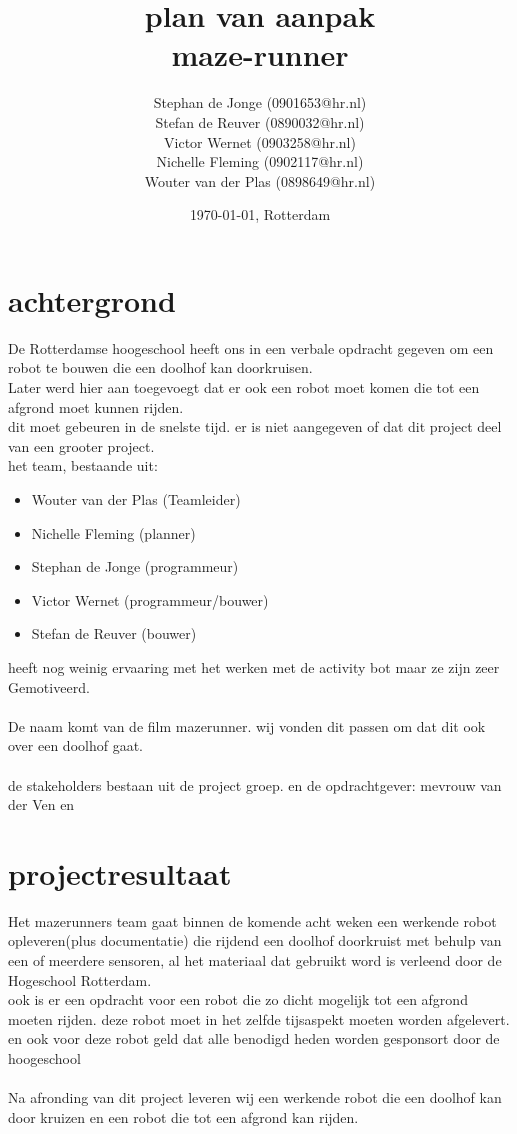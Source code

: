 \documentclass[oneside]{book}
\title{plan van aanpak\\maze-runner}
\author{
	Stephan de Jonge (0901653@hr.nl)\\
	Stefan de Reuver (0890032@hr.nl)\\
	Victor Wernet (0903258@hr.nl)\\
	Nichelle Fleming (0902117@hr.nl)\\
	Wouter van der Plas (0898649@hr.nl)
}
\date{\today, Rotterdam}
\begin{document}
\maketitle
\tableofcontents


\chapter{achtergrond}

De Rotterdamse hoogeschool heeft ons in een verbale opdracht gegeven om een robot te bouwen die een doolhof kan doorkruisen.\\
Later werd hier aan toegevoegt dat er ook een robot moet komen die tot een afgrond moet kunnen rijden.\\
dit moet gebeuren in de snelste tijd. er is niet aangegeven of dat dit project deel van een grooter project.\\
het team, bestaande uit:\\
\begin{itemize}
	\item Wouter van der Plas (Teamleider)
	\item Nichelle Fleming (planner)
	\item Stephan de Jonge (programmeur)
	\item Victor Wernet (programmeur/bouwer)
	\item Stefan de Reuver (bouwer)
\end{itemize}	
heeft nog weinig ervaaring met het werken met de activity bot maar ze zijn zeer Gemotiveerd.\\
\\
De naam komt van de film mazerunner. wij vonden dit passen om dat dit ook over een doolhof gaat.\\
\\
de stakeholders bestaan uit de project groep. en de opdrachtgever: mevrouw van der Ven en

\clearpage
\chapter{projectresultaat}
Het mazerunners team gaat binnen de komende acht weken een werkende robot opleveren(plus documentatie) die rijdend een doolhof doorkruist met behulp van een of meerdere sensoren, al het materiaal dat gebruikt word is verleend door de Hogeschool Rotterdam.\\
ook is er een opdracht voor een robot die zo dicht mogelijk tot een afgrond moeten rijden. deze robot moet in het zelfde tijsaspekt moeten worden afgelevert. en ook voor deze robot geld dat alle benodigd heden worden gesponsort door de hoogeschool\\
\\
Na afronding van dit project leveren wij een werkende robot die een doolhof kan door kruizen en een robot die tot een afgrond kan rijden.
\clearpage
\end{document}
